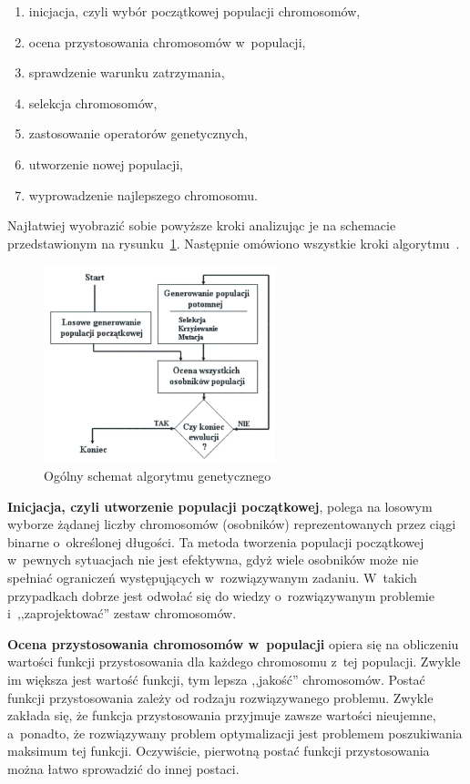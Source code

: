 \documentclass[twoside,12pt]{report}
\begin{document}
\begin{enumerate}
\item inicjacja, czyli wybór początkowej populacji chromosomów,
\item ocena przystosowania chromosomów w~populacji,
\item sprawdzenie warunku zatrzymania,
\item selekcja chromosomów,
\item zastosowanie operatorów genetycznych,
\item utworzenie nowej populacji,
\item wyprowadzenie najlepszego chromosomu.
\end{enumerate}

Najłatwiej wyobrazić sobie powyższe kroki analizując je na schemacie przedstawionym na rysunku~\ref{fig:ogolny_schemat_alg_genetycznego}. Następnie omówiono wszystkie kroki algorytmu~\cite{gene}.

\begin{figure}[htbp]
	\centering
	\includegraphics[width=0.6\textwidth]{img/ogolgene}
	\caption{Ogólny schemat algorytmu genetycznego}
	\label{fig:ogolny_schemat_alg_genetycznego}
\end{figure}

\textbf{Inicjacja, czyli utworzenie populacji początkowej}, polega na losowym wyborze żądanej liczby chromosomów (osobników) reprezentowanych przez ciągi binarne o~określonej długości. Ta metoda tworzenia populacji początkowej w~pewnych sytuacjach nie jest efektywna, gdyż wiele osobników może nie spełniać ograniczeń występujących w~rozwiązywanym zadaniu. W~takich przypadkach dobrze jest odwołać się do wiedzy o~rozwiązywanym problemie i~,,zaprojektować'' zestaw chromosomów.

\textbf{Ocena przystosowania chromosomów w~populacji} opiera się na obliczeniu wartości funkcji przystosowania dla każdego chromosomu z~tej populacji. Zwykle im większa jest wartość funkcji, tym lepsza ,,jakość'' chromosomów. Postać funkcji przystosowania zależy od rodzaju rozwiązywanego problemu. Zwykle zakłada się, że funkcja przystosowania przyjmuje zawsze wartości nieujemne, a~ponadto, że rozwiązywany problem optymalizacji jest problemem poszukiwania maksimum tej funkcji. Oczywiście, pierwotną postać funkcji przystosowania można łatwo sprowadzić do innej postaci.
\end{document}
